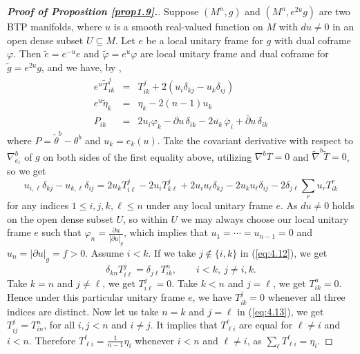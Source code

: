 \documentclass{amsart}
\numberwithin{equation}{section}
\theoremstyle{definition}
\renewcommand{\1}{\mathds{1}}
\renewcommand{\>}{\rightarrow}
\begin{document}
\begin{proof}[{\bf Proof of Proposition \ref{prop1.9}.}]
Suppose $(M^n,g)$ and $(M^n,e^{2u}g)$ are two BTP manifolds,
where $u$ is a smooth real-valued function on $M$ with $du\neq 0$ in an open dense subset $U\subseteq M$.
Let $e$ be a local unitary frame for $g$ with dual coframe $\varphi$.
Then $\tilde{e}=e^{-u}e$ and $\tilde{\varphi} = e^u\varphi$ are local unitary frame and dual coframe for $\tilde{g}=e^{2u}g$,
and we have, by \cite[the proof of Theorem 3]{YZZ},
\begin{eqnarray*}
e^u\tilde{T}^j_{ik} & = & T^j_{ik} + 2(u_i \delta_{kj} - u_k \delta_{ij}) \\
e^u \tilde{\eta}_k & = & \eta_k - 2(n-1)u_k \\
P_{ik} \ \ & = & 2u_i \varphi_k - \partial u \, \delta_{ik} - 2\overline{u_k} \, \overline{\varphi}_i + \overline{\partial}u \, \delta_{ik}
\end{eqnarray*}
where $P=\tilde{\theta}^b-\theta^b$ and $u_k=e_k(u)$. Take the covariant derivative
with respect to $\nabla^b_{\!e_{\ell}}$ of $g$ on both sides of the first equality above,
utilizing $\nabla^bT=0$ and $\tilde{\nabla}^b \tilde{T} =0$, so we get
\begin{equation}
u_{i,\ell}\delta_{kj} - u_{k,\ell} \delta_{ij} = 2u_kT^j_{i\ell} - 2u_i T^j_{k\ell} +2u_iu_{\ell} \delta_{kj} - 2u_k u_{\ell} \delta_{ij} - 2\delta_{j\ell} \sum_r u_r T^r_{ik}   \label{eq:4.12}
\end{equation}
for any indices $1\leq i,j,k,\ell \leq n$ under any local unitary frame $e$. As $du\neq 0$ holds on the open dense subset $U$, so within $U$ we may always choose our local unitary frame $e$ such that $\varphi_n= \frac{\partial u}{|\partial u|_g}$, which implies that $u_1=\cdots =u_{n-1}=0$ and $u_n=|\partial u|_g=f >0$. Assume $i<k$. If we take $j\notin \{ i,k\}$ in (\ref{eq:4.12}), we get
\begin{equation}
\delta_{kn} T^j_{i\ell} = \delta_{j\ell} T^n_{ik},   \qquad  i<k, \ j\neq i, k. \label{eq:4.13}
\end{equation}
Take $k=n$ and $j\neq \ell$, we get $T^j_{i\ell}=0$. Take $k<n$ and $j=\ell$, we get $T^n_{ik}=0$.
Hence under this particular unitary frame $e$, we have $T^j_{ik}=0$ whenever all three indices are distinct.
Now let us take $n=k$ and $j=\ell$ in (\ref{eq:4.13}), we get $T^j_{ij}=T^n_{in}$, for all $i,j<n$ and $i\neq j$.
It implies that $T^{\ell}_{\ell i}$ are equal for $\ell \neq i$ and $i<n$. Therefore
$T^{\ell}_{\ell i} = \frac{1}{n-1} \eta_i $ whenever $i<n$ and $\ell \neq i$, as $\sum_\ell T^{\ell}_{\ell i}=\eta_i$.


\end{proof}
\end{document}
